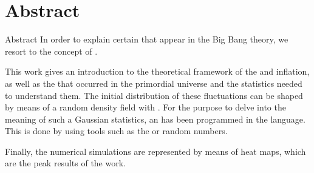 \section{Abstract}
\begin{frame}[noframenumbering]{Abstract}
    In order to explain certain  that appear in the Big Bang theory, we resort to the concept of .

    This work gives an introduction to the theoretical framework of the  and inflation, as well as the  that occurred in the primordial universe and the statistics needed to understand them. The initial distribution of these fluctuations can be shaped by means of a random density field with . For the purpose to delve into the meaning of such a Gaussian statistics, an  has been programmed in the  language. This is done by using tools such as the  or random numbers.
    
    Finally, the numerical simulations are represented by means of heat maps, which are the peak results of the work.
\end{frame}